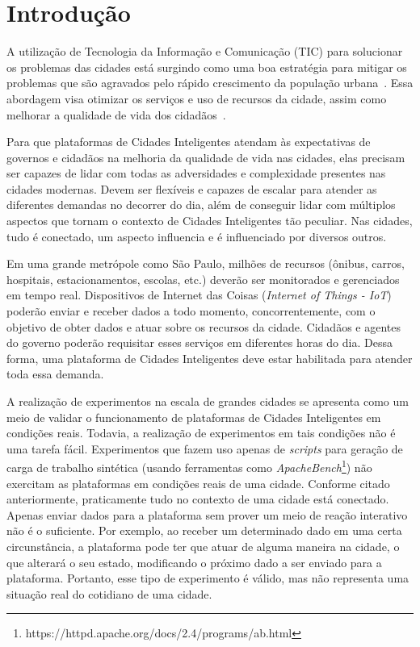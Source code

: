 \chapter{Introdução}
\label{cap:introducao}


A utilização de Tecnologia da Informação e Comunicação (TIC) para solucionar os problemas das cidades está surgindo como uma boa estratégia para mitigar os problemas que são agravados pelo rápido crescimento da população urbana~\citep{chourabi_2012}.
Essa abordagem visa otimizar os serviços e uso de recursos da cidade, assim como melhorar a qualidade de vida dos cidadãos~\citep{santana_2016}.

Para que plataformas de Cidades Inteligentes atendam às expectativas de governos e cidadãos na melhoria da qualidade de vida nas cidades, elas precisam ser capazes de lidar com todas as adversidades e
complexidade presentes nas cidades modernas.
Devem ser flexíveis e capazes de escalar para atender as diferentes demandas no decorrer do dia, além de conseguir lidar com múltiplos aspectos que tornam o contexto de Cidades Inteligentes tão
peculiar.
Nas cidades, tudo é conectado, um aspecto influencia e é influenciado por diversos outros.

Em uma grande metrópole como São Paulo, milhões de recursos (ônibus, carros, hospitais, estacionamentos, escolas, etc.) deverão ser monitorados e gerenciados em tempo real.
Dispositivos de Internet das Coisas (\textit{Internet of Things - IoT}) poderão enviar e receber dados a todo momento, concorrentemente, com o objetivo de obter dados e atuar sobre os recursos da cidade.
Cidadãos e agentes do governo poderão requisitar esses serviços em diferentes horas do dia.
Dessa forma, uma plataforma de Cidades Inteligentes deve estar habilitada para atender toda essa demanda.

A realização de experimentos na escala de grandes cidades se apresenta como um meio de validar o funcionamento de plataformas de Cidades Inteligentes em condições reais.
Todavia, a realização de experimentos em tais condições não é uma tarefa fácil.
Experimentos que fazem uso apenas de \textit{scripts} para geração de carga de trabalho sintética (usando ferramentas como \textit{ApacheBench}\footnote{https://httpd.apache.org/docs/2.4/programs/ab.html})
não exercitam as plataformas em condições reais de uma cidade.
Conforme citado anteriormente, praticamente tudo no contexto de uma cidade está conectado.
Apenas enviar dados para a plataforma sem prover um meio de reação interativo não é o suficiente.
Por exemplo, ao receber um determinado dado em uma certa circunstância, a plataforma pode ter que atuar de alguma maneira na cidade, o que alterará o seu estado, modificando o próximo dado a ser enviado 
para a plataforma.
Portanto, esse tipo de experimento é válido, mas não representa uma situação real do cotidiano de uma cidade.

